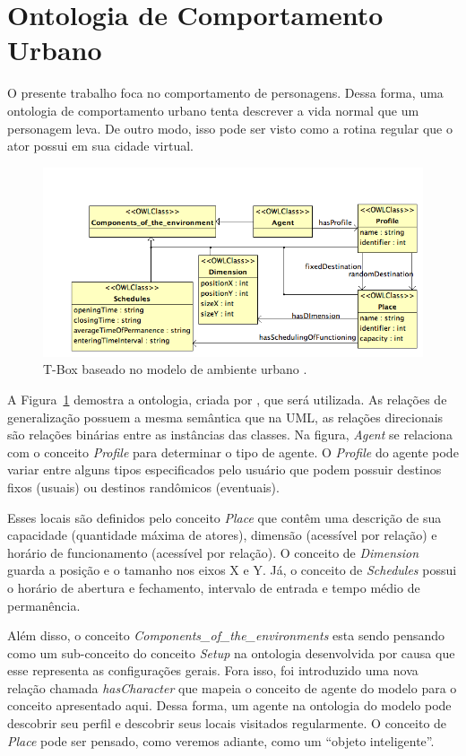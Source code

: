 \section{Ontologia de Comportamento Urbano} \label{ch:aec:ocu}

O presente trabalho foca no comportamento de personagens. Dessa forma, uma
ontologia de comportamento urbano tenta descrever a vida normal que um
personagem leva. De outro modo, isso pode ser visto como a rotina regular que
o ator possui em sua cidade virtual.

\begin{figure}[t]
  \centering
    \includegraphics[width=150mm]{figuras/uem-tbox.png}
  \caption{T-Box baseado no modelo de ambiente urbano \cite{paiva2005ontology}.}
  \label{fig:UEM:TBOX}
\end{figure}

A Figura~\ref{fig:UEM:TBOX} demostra a ontologia, criada por
\citet{paiva2005ontology}, que será utilizada. As relações de generalização
possuem a mesma semântica que na UML, as relações direcionais são relações
binárias entre as instâncias das classes. Na figura, \emph{Agent} se relaciona
com o conceito \emph{Profile} para determinar o tipo de agente. O
\emph{Profile} do agente pode variar entre alguns tipos especificados pelo
usuário que podem possuir destinos fixos (usuais) ou destinos randômicos
(eventuais).

Esses locais são definidos pelo conceito \emph{Place} que contêm
uma descrição de sua capacidade (quantidade máxima de atores), dimensão
(acessível por relação) e horário de funcionamento (acessível por relação). O
conceito de \emph{Dimension} guarda a posição e o tamanho nos eixos X e Y. Já,
o conceito de \emph{Schedules} possui o horário de abertura e fechamento,
intervalo de entrada e tempo médio de permanência.

Além disso, o conceito \emph{Components\_of\_the\_environments} esta sendo
pensando como um sub-conceito do conceito \emph{Setup} na ontologia
desenvolvida por causa que esse representa as configurações gerais.
%
Fora isso, foi introduzido uma nova relação chamada \emph{hasCharacter} que
mapeia o conceito de agente do modelo \occ para o conceito apresentado aqui.
Dessa forma, um agente na ontologia do
modelo \occ pode descobrir seu perfil e descobrir seus locais visitados
regularmente. O conceito de \emph{Place} pode ser pensado, como veremos
adiante, como um ``objeto inteligente''.

